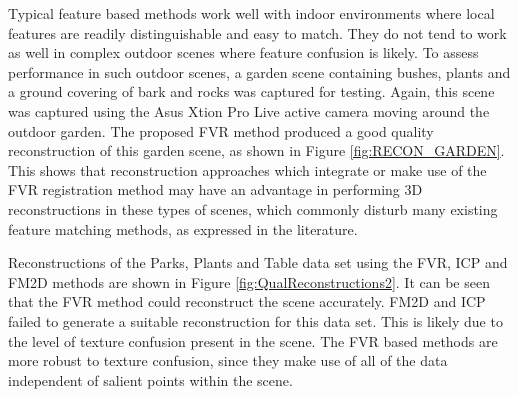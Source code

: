 Typical feature based methods work well with indoor environments where local features are readily distinguishable and easy to match. They do not tend to work as well in complex outdoor scenes where feature confusion is likely. To assess performance in such outdoor scenes, a garden scene containing bushes, plants and a ground covering of bark and rocks was captured for testing. Again, this scene was captured using the Asus Xtion Pro Live active camera moving around the outdoor garden. The proposed FVR method produced a good quality reconstruction of this garden scene, as shown in Figure \ref{fig:RECON_GARDEN}. This shows that reconstruction approaches which integrate or make use of the FVR registration method may have an advantage in performing 3D reconstructions in these types of scenes, which commonly disturb many existing feature matching methods, as expressed in the literature.   

Reconstructions of the Parks, Plants and Table data set using the FVR, ICP and FM2D methods are shown in Figure \ref{fig:QualReconstructions2}. It can be seen that the FVR method could reconstruct the scene accurately. FM2D and ICP failed to generate a suitable reconstruction for this data set. This is likely due to the level of texture confusion present in the scene. The FVR based methods are more robust to texture confusion, since they make use of all of the data independent of salient points within the scene.


